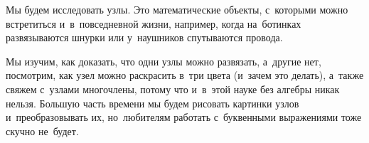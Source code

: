 



Мы будем исследовать узлы.
Это математические объекты, с~которыми можно встретиться и~в~повседневной
жизни, например, когда на~ботинках развязываются шнурки или у~наушников
спутываются провода.

Мы изучим, как доказать, что одни узлы можно развязать, а~другие нет,
посмотрим, как узел можно раскрасить в~три цвета (и~зачем это делать), а~также
свяжем с~узлами многочлены, потому что и~в~этой науке без алгебры никак нельзя.
Большую часть времени мы будем рисовать картинки узлов и~преобразовывать их,
но~любителям работать с~буквенными выражениями  тоже скучно не~будет.
